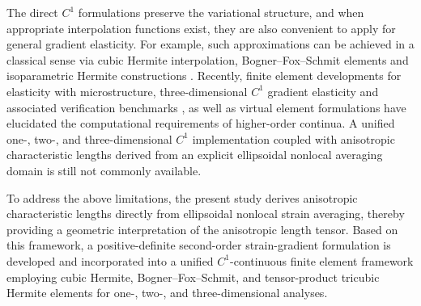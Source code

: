 \documentclass[final,3p,times,fleqn]{elsarticle}
\begin{document}
The direct $C^{1}$ formulations preserve the variational structure, and when appropriate interpolation functions exist, they are also convenient to apply for general gradient elasticity. For example, such approximations can be achieved in a classical sense via cubic Hermite interpolation, Bogner--Fox--Schmit elements and isoparametric Hermite constructions \cite{BognerFoxSchmit1966,PeteraPittman1994}. Recently, finite element developments for elasticity with microstructure, three-dimensional $C^{1}$ gradient elasticity and associated verification benchmarks \cite{Zervos2008,Papanicolopulos2009}, as well as virtual element formulations \cite{Yang2021,WriggersHudobivnik2023} have elucidated the computational requirements of higher-order continua. A unified one-, two-, and three-dimensional $C^{1}$ implementation coupled with anisotropic characteristic lengths derived from an explicit ellipsoidal nonlocal averaging domain is still not commonly available.

To address the above limitations, the present study derives anisotropic characteristic lengths directly from ellipsoidal nonlocal strain averaging, thereby providing a geometric interpretation of the anisotropic length tensor. Based on this framework, a positive-definite second-order strain-gradient formulation is developed and incorporated into a unified $C^{1}$-continuous finite element framework employing cubic Hermite, Bogner--Fox--Schmit, and tensor-product tricubic Hermite elements for one-, two-, and three-dimensional analyses.
\end{document}
